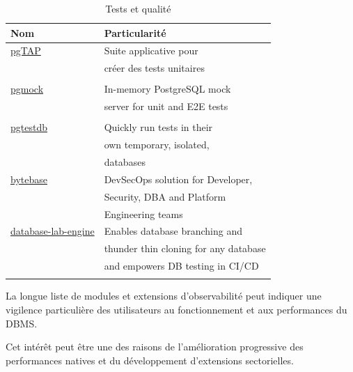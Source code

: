 \documentclass[a4paper,12pt]{article}
\begin{document}
\begin{multicols*}{2}
\begin{table}[H]
\caption{Tests et qualité}
\centering
\begin{tabular}{ll}
Nom & Particularité\\
\hline
\href{https://github.com/theory/pgtap}{pgTAP} & Suite applicative pour\\
 & créer des tests unitaires\\
 & \\
\href{https://github.com/stack-auth/pgmock}{pgmock} & In-memory PostgreSQL mock\\
 & server for unit and E2E tests\\
 & \\
\href{https://github.com/peterldowns/pgtestdb}{pgtestdb} & Quickly run tests in their\\
 & own temporary, isolated,\\
 & databases\\
\href{https://github.com/bytebase/bytebase}{bytebase} & DevSecOps solution for Developer,\\
 & Security, DBA and Platform\\
 & Engineering teams\\
\href{https://github.com/postgres-ai/database-lab-engine}{database-lab-engine} & Enables database branching and\\
 & thunder thin cloning for any database\\
 & and empowers DB testing in CI/CD\\
 & \\
\end{tabular}
\end{table}

La longue liste de modules et extensions d'observabilité peut indiquer une vigilence particulière des utilisateurs au fonctionnement et aux performances du DBMS.

Cet intérêt peut être une des raisons de l'amélioration progressive des performances natives et du développement d'extensions sectorielles.


\end{multicols*}
\end{document}
